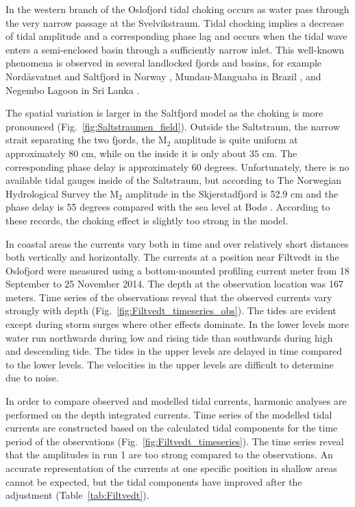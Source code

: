 In the western branch of the Oslofjord tidal choking occurs as water pass through the very narrow passage at the Svelvikstraum. Tidal chocking implies a decrease of tidal amplitude and a corresponding phase lag \cite[]{stigebrandt80} and occurs when the tidal wave enters a semi-enclosed basin through a sufficiently narrow inlet. This well-known phenomena is observed in several landlocked fjords and basins, for example Nord{\aa}svatnet and Saltfjord in Norway \cite[]{glenne63,eliassen01}, Mundau-Manguaba in Brazil \cite[]{oliveira93}, and Negembo Lagoon in Sri Lanka \cite[]{rydberg96}. 

The spatial variation is larger in the Saltfjord model as the choking is more pronounced (Fig.~\ref{fig:Saltstraumen_field}). Outside the Saltstraum, the narrow strait separating the two fjords, the M$_2$ amplitude is quite uniform at approximately $80$ cm, while on the inside it is only about $35$ cm. The corresponding phase delay is approximately $60$ degrees. Unfortunately, there is no available tidal gauges inside of the Saltstraum, but according to The Norwegian Hydrological Survey the M$_2$ amplitude in the Skjerstadfjord is 52.9 cm and the phase delay is 55 degrees compared with the sea level at Bod{\o} \cite[]{tide16}.
According to these records, the choking effect is slightly too strong in the model.

In coastal areas the currents vary both in time and over relatively short distances both vertically and horizontally. The currents at a position near Filtvedt in the Oslofjord were measured using a bottom-mounted profiling current meter from 18 September to 25 November 2014. The depth at the observation location was 167 meters. Time series of the observations reveal that the observed currents vary strongly with depth (Fig.~\ref{fig:Filtvedt_timeseries_obs}). The tides are evident except during storm surges where other effects dominate. In the lower levels more water run northwards during low and rising tide than southwards during high and descending tide. The tides in the upper levels are delayed in time compared to the lower levels. The velocities in the upper levels are difficult to determine due to noise. 

In order to compare observed and modelled tidal currents, harmonic analyses are performed on the depth integrated currents. Time series of the modelled tidal currents are constructed based on the calculated tidal components for the time period of the observations (Fig.~\ref{fig:Filtvedt_timeseries}). The time series reveal that the amplitudes in run 1 are too strong compared to the observations. 
An accurate representation of the currents at one specific position in shallow areas cannot be expected, but the tidal components have improved after the adjustment (Table~\ref{tab:Filtvedt}). 

